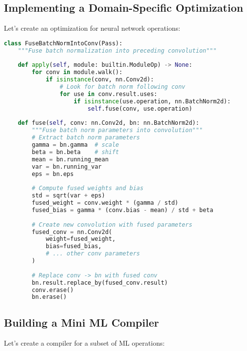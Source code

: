 \documentclass[11pt,a4paper]{article}
\begin{document}
\subsection{Implementing a Domain-Specific Optimization}

Let's create an optimization for neural network operations:

\begin{lstlisting}[language=Python, caption=Neural Network Optimization]
class FuseBatchNormIntoConv(Pass):
    """Fuse batch normalization into preceding convolution"""
    
    def apply(self, module: builtin.ModuleOp) -> None:
        for conv in module.walk():
            if isinstance(conv, nn.Conv2d):
                # Look for batch norm following conv
                for use in conv.result.uses:
                    if isinstance(use.operation, nn.BatchNorm2d):
                        self.fuse(conv, use.operation)
    
    def fuse(self, conv: nn.Conv2d, bn: nn.BatchNorm2d):
        """Fuse batch norm parameters into convolution"""
        # Extract batch norm parameters
        gamma = bn.gamma  # scale
        beta = bn.beta    # shift
        mean = bn.running_mean
        var = bn.running_var
        eps = bn.eps
        
        # Compute fused weights and bias
        std = sqrt(var + eps)
        fused_weight = conv.weight * (gamma / std)
        fused_bias = gamma * (conv.bias - mean) / std + beta
        
        # Create new convolution with fused parameters
        fused_conv = nn.Conv2d(
            weight=fused_weight,
            bias=fused_bias,
            # ... other conv parameters
        )
        
        # Replace conv -> bn with fused conv
        bn.result.replace_by(fused_conv.result)
        conv.erase()
        bn.erase()
\end{lstlisting}

\subsection{Building a Mini ML Compiler}

Let's create a compiler for a subset of ML operations:
\end{document}
